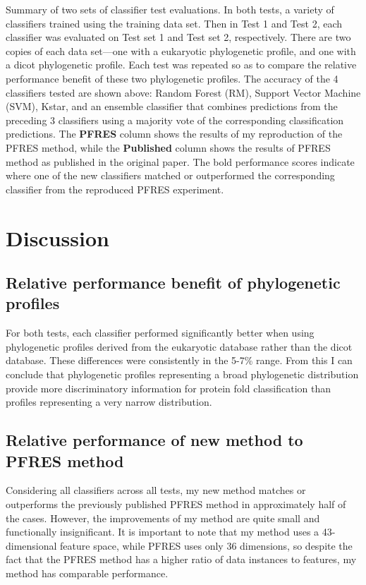 \documentclass{bioinfo}
\begin{document}
\begin{table}
  \caption{Summary of two sets of classifier test evaluations. In both tests, a variety of classifiers trained using the training data set. Then in Test 1 and Test 2, each classifier was evaluated on Test set 1 and Test set 2, respectively. There are two copies of each data set---one with a eukaryotic phylogenetic profile, and one with a dicot phylogenetic profile. Each test was repeated so as to compare the relative performance benefit of these two phylogenetic profiles. The accuracy of the 4 classifiers tested are shown above: Random Forest (RM), Support Vector Machine (SVM), Kstar, and an ensemble classifier that combines predictions from the preceding 3 classifiers using a majority vote of the corresponding classification predictions. The \textbf{PFRES} column shows the results of my reproduction of the PFRES method, while the \textbf{Published} column shows the results of PFRES method as published in the original paper. The bold performance scores indicate where one of the new classifiers matched or outperformed the corresponding classifier from the reproduced PFRES experiment.}
  \label{ResultsTable}
\end{table}


\section*{Discussion}
\subsection*{Relative performance benefit of phylogenetic profiles}
For both tests, each classifier performed significantly better when using phylogenetic profiles derived from the eukaryotic database rather than the dicot database.
These differences were consistently in the 5-7\% range.
From this I can conclude that phylogenetic profiles representing a broad phylogenetic distribution provide more discriminatory information for protein fold classification than profiles representing a very narrow distribution.

\subsection*{Relative performance of new method to PFRES method}
Considering all classifiers across all tests, my new method matches or outperforms the previously published PFRES method in approximately half of the cases.
However, the improvements of my method are quite small and functionally insignificant.
It is important to note that my method uses a 43-dimensional feature space, while PFRES uses only 36 dimensions, so despite the fact that the PFRES method has a higher ratio of data instances to features, my method has comparable performance.
\end{document}
